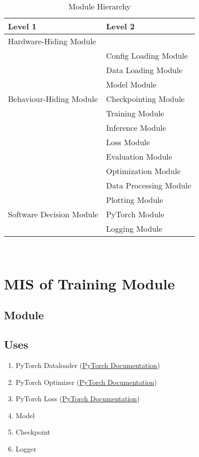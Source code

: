 \documentclass[12pt, titlepage]{article}
\begin{document}
\begin{table}[h!]
  \centering
  \begin{tabular}{p{} p{}}
  \toprule
  \textbf{Level 1} & \textbf{Level 2}\\
  \midrule
  
  {Hardware-Hiding Module} & ~ \\
  \midrule
  
  \multirow{7}{0.3\textwidth}{Behaviour-Hiding Module} 
  & Config Loading Module\\
  & Data Loading Module\\
  & Model Module\\
  & Checkpointing Module\\
  & Training Module\\
  & Inference Module\\
  & Loss Module\\ 
  & Evaluation Module\\
  & Optimization Module\\
  & Data Processing Module\\
  \midrule
  
  \multirow{3}{0.3\textwidth}{Software Decision Module}
  & Plotting Module\\
  & PyTorch Module\\
  & Logging Module\\
  \bottomrule
  
  \end{tabular}
  \caption{Module Hierarchy}
  \label{TblMH}
  \end{table}

\newpage
~\newpage

\section{MIS of Training Module} \label{Module} 

\subsection{Module}



\subsection{Uses}
\begin{enumerate}
  \item PyTorch Dataloader (\href{https://pytorch.org/tutorials/beginner/basics/data_tutorial.html}{PyTorch Documentation})
  \item PyTorch Optimizer (\href{https://pytorch.org/docs/stable/optim.html}{PyTorch Documentation})
  \item PyTorch Loss (\href{https://pytorch.org/docs/stable/nn.html#loss-functions}{PyTorch Documentation})
  \item Model
  \item Checkpoint
  \item Logger
\end{enumerate}
\end{document}
